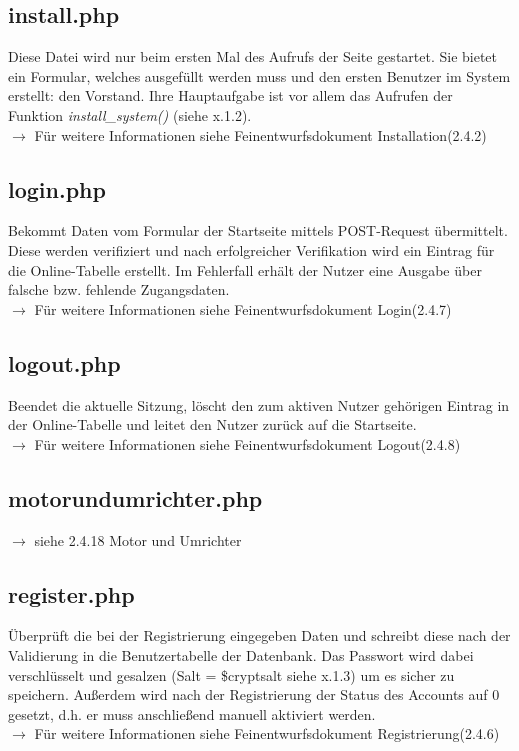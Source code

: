 \documentclass[fontsize = 12pt, paper = a4]{scrreprt}
\begin{document}
\subsection{install.php}
Diese Datei wird nur beim ersten Mal des Aufrufs der Seite gestartet. Sie bietet ein Formular, welches ausgefüllt werden muss und den ersten Benutzer im System erstellt: den Vorstand. Ihre Hauptaufgabe ist vor allem das Aufrufen der Funktion \textit{install\_system()} (siehe x.1.2).\\
$\rightarrow$ Für weitere Informationen siehe Feinentwurfsdokument \glqq Installation\grqq (2.4.2)

\subsection{login.php}
Bekommt Daten vom Formular der Startseite mittels POST-Request übermittelt. Diese werden verifiziert und nach erfolgreicher Verifikation wird ein Eintrag für die Online-Tabelle erstellt. Im Fehlerfall erhält der Nutzer eine Ausgabe über falsche bzw. fehlende Zugangsdaten. \\
$\rightarrow$ Für weitere Informationen siehe Feinentwurfsdokument \glqq Login\grqq(2.4.7)

\subsection{logout.php}
Beendet die aktuelle Sitzung, löscht den zum aktiven Nutzer gehörigen Eintrag in der Online-Tabelle und leitet den Nutzer zurück auf die Startseite.\\
$\rightarrow$ Für weitere Informationen siehe Feinentwurfsdokument \glqq Logout\grqq (2.4.8)

\subsection{motorundumrichter.php}
$\rightarrow$ siehe 2.4.18 Motor und Umrichter

\subsection{register.php}
Überprüft die bei der Registrierung eingegeben Daten und schreibt diese nach der Validierung in die Benutzertabelle der Datenbank. Das Passwort wird dabei verschlüsselt und gesalzen (Salt = \$cryptsalt siehe x.1.3) um es sicher zu speichern. Außerdem wird nach der Registrierung der Status des Accounts auf 0 gesetzt, d.h. er muss anschließend manuell aktiviert werden.\\
$\rightarrow$ Für weitere Informationen siehe Feinentwurfsdokument \glqq Registrierung\grqq (2.4.6)
\end{document}

